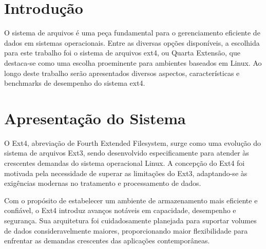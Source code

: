 \documentclass[
	12pt,				%
	openright,			%
	oneside,			%
	a4paper,			%
	chapter=TITLE,		%
	english,			%
	french,				%
	spanish,			%
	brazil				%
	]{abntex2}
\theoremstyle{definition}
\begin{document}
\frenchspacing 

\imprimircapa


\imprimirfolhaderosto

\newpage

\setlength{\absparsep}{18pt} %

\tableofcontents*
\cleardoublepage
\textual


\chapter{Introdução}
O sistema de arquivos é uma peça fundamental para o gerenciamento eficiente de dados em 
sistemas operacionais. Entre as diversas opções disponíveis, a escolhida para este trabalho 
foi o sistema de arquivos ext4, ou Quarta Extensão, que destaca-se como uma escolha proeminente para ambientes 
baseados em Linux. Ao longo deste trabalho serão apresentados diversos aspectos, características e benchmarks de desempenho 
do sistema ext4.

\chapter{Apresentação do Sistema}
O Ext4, abreviação de Fourth Extended Filesystem, surge como uma evolução do sistema de arquivos Ext3, sendo desenvolvido especificamente para atender às crescentes demandas do sistema operacional Linux. A concepção do Ext4 foi motivada pela necessidade de superar as limitações do Ext3, adaptando-se às exigências modernas no tratamento e processamento de dados.

Com o propósito de estabelecer um ambiente de armazenamento mais eficiente e confiável, o Ext4 introduz avanços notáveis em capacidade, desempenho e segurança. Sua arquitetura foi cuidadosamente planejada para suportar volumes de dados consideravelmente maiores, proporcionando maior flexibilidade para enfrentar as demandas crescentes das aplicações contemporâneas.
\end{document}
